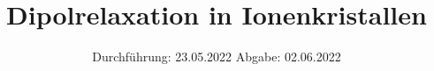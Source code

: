 

\subject{V48}
\title{Dipolrelaxation in Ionenkristallen}
\date{%
  Durchführung: 23.05.2022
  \hspace{3em}
  Abgabe: 02.06.2022
}



\maketitle
\thispagestyle{empty}
\tableofcontents
\newpage





% 

\printbibliography{}


